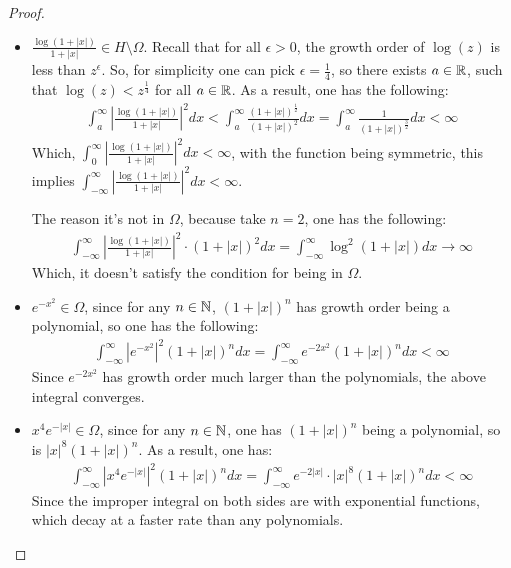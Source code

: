 \documentclass{article}
\begin{document}
\begin{proof}
\begin{enumerate}
\begin{itemize}
            \item[(d)] $\frac{\log(1+|x|)}{1+|x|}\in H\setminus \Omega$. Recall that for all $\epsilon>0$, the growth order of $\log(z)$ is less than $z^\epsilon$. So, for simplicity one can pick $\epsilon=\frac{1}{4}$, so there exists $a\in\mathbb{R}$, such that $\log(z) < z^\frac{1}{4}$ for all $a\in\mathbb{R}$. As a result, one has the following:
            \begin{align}
                \int_{a}^{\infty}\left|\frac{\log(1+|x|)}{1+|x|}\right|^2dx < \int_{a}^{\infty}\frac{(1+|x|)^\frac{1}{2}}{(1+|x|)^2}dx = \int_{a}^{\infty}\frac{1}{(1+|x|)^\frac{3}{2}}dx < \infty
            \end{align}
            Which, $\int_{0}^{\infty}\left|\frac{\log(1+|x|)}{1+|x|}\right|^2dx<\infty$, with the function being symmetric, this implies $\int_{-\infty}^{\infty}\left|\frac{\log(1+|x|)}{1+|x|}\right|^2dx<\infty$.

            The reason it's not in $\Omega$, because take $n=2$, one has the following:
            \begin{align}
                \int_{-\infty}^{\infty}\left|\frac{\log(1+|x|)}{1+|x|}\right|^2 \cdot (1+|x|)^2 dx = \int_{-\infty}^{\infty}\log^2(1+|x|)dx \rightarrow \infty
            \end{align}
            Which, it doesn't satisfy the condition for being in $\Omega$.
            
            \hfil

            \item[(e)] $e^{-x^2}\in \Omega$, since for any $n\in\mathbb{N}$, $(1+|x|)^n$ has growth order being a polynomial, so one has the following:
            \begin{align}
                \int_{-\infty}^{\infty}|e^{-x^2}|^2 (1+|x|)^ndx = \int_{-\infty}^{\infty}e^{-2x^2}(1+|x|)^n dx < \infty
            \end{align}
            Since $e^{-2x^2}$ has growth order much larger than the polynomials, the above integral converges.
            
            \hfil

            \item[(f)] $x^4e^{-|x|} \in \Omega$, since for any $n\in\mathbb{N}$, one has $(1+|x|)^n$ being a polynomial, so is $|x|^8(1+|x|)^n$. As a result, one has:
            \begin{align}
                \int_{-\infty}^{\infty}|x^4e^{-|x|}|^2 (1+|x|)^n dx = \int_{-\infty}^{\infty}e^{-2|x|}\cdot |x|^8(1+|x|)^n dx < \infty
            \end{align}
            Since the improper integral on both sides are with exponential functions, which decay at a faster rate than any polynomials.
        \end{itemize}
    \end{enumerate}
\end{proof}
\end{document}
